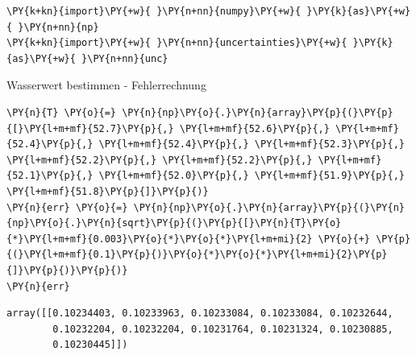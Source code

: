 

    
    \begin{tcolorbox}[breakable, size=fbox, boxrule=1pt, pad at break*=1mm,colback=cellbackground, colframe=cellborder]
\begin{Verbatim}[commandchars=\\\{\}]
\PY{k+kn}{import}\PY{+w}{ }\PY{n+nn}{numpy}\PY{+w}{ }\PY{k}{as}\PY{+w}{ }\PY{n+nn}{np}
\PY{k+kn}{import}\PY{+w}{ }\PY{n+nn}{uncertainties}\PY{+w}{ }\PY{k}{as}\PY{+w}{ }\PY{n+nn}{unc}
\end{Verbatim}
\end{tcolorbox}

    Wasserwert bestimmen - Fehlerrechnung

    \begin{tcolorbox}[breakable, size=fbox, boxrule=1pt, pad at break*=1mm,colback=cellbackground, colframe=cellborder]
\begin{Verbatim}[commandchars=\\\{\}]
\PY{n}{T} \PY{o}{=} \PY{n}{np}\PY{o}{.}\PY{n}{array}\PY{p}{(}\PY{p}{[}\PY{l+m+mf}{52.7}\PY{p}{,} \PY{l+m+mf}{52.6}\PY{p}{,} \PY{l+m+mf}{52.4}\PY{p}{,} \PY{l+m+mf}{52.4}\PY{p}{,} \PY{l+m+mf}{52.3}\PY{p}{,} \PY{l+m+mf}{52.2}\PY{p}{,} \PY{l+m+mf}{52.2}\PY{p}{,} \PY{l+m+mf}{52.1}\PY{p}{,} \PY{l+m+mf}{52.0}\PY{p}{,} \PY{l+m+mf}{51.9}\PY{p}{,} \PY{l+m+mf}{51.8}\PY{p}{]}\PY{p}{)}
\PY{n}{err} \PY{o}{=} \PY{n}{np}\PY{o}{.}\PY{n}{array}\PY{p}{(}\PY{n}{np}\PY{o}{.}\PY{n}{sqrt}\PY{p}{(}\PY{p}{[}\PY{n}{T}\PY{o}{*}\PY{l+m+mf}{0.003}\PY{o}{*}\PY{o}{*}\PY{l+m+mi}{2} \PY{o}{+} \PY{p}{(}\PY{l+m+mf}{0.1}\PY{p}{)}\PY{o}{*}\PY{o}{*}\PY{l+m+mi}{2}\PY{p}{]}\PY{p}{)}\PY{p}{)}
\PY{n}{err}
\end{Verbatim}
\end{tcolorbox}

            \begin{tcolorbox}[breakable, size=fbox, boxrule=.5pt, pad at break*=1mm, opacityfill=0]
\begin{Verbatim}[commandchars=\\\{\}]
array([[0.10234403, 0.10233963, 0.10233084, 0.10233084, 0.10232644,
        0.10232204, 0.10232204, 0.10231764, 0.10231324, 0.10230885,
        0.10230445]])
\end{Verbatim}
\end{tcolorbox}
        

